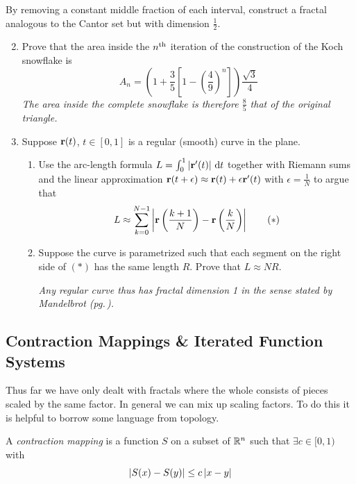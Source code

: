 \begin{exercises}
	\exstart By removing a constant middle fraction of each interval, construct a fractal analogous to the Cantor set but with dimension $\frac 12$.
	
	\begin{enumerate}\setcounter{enumi}{1}\itemsep2pt
		\item Prove that the area inside the $n\textsuperscript{th}$ iteration of the construction of the Koch snowflake is
		\[
			A_n=\left(1+\frac 35\left[1-\left(\frac 49\right)^n\right]\right)\frac{\sqrt 3}{4}
		\]
		\emph{The area inside the complete snowflake is therefore $\frac 85$ that of the original triangle.}
		
		\item Suppose ${\mathbf{r}}(t)$, $t\in [0,1]$ is a regular (smooth) curve in the plane.
		\begin{enumerate}
	  	\item Use the arc-length formula $L=\int_0^1\left| {\mathbf{r}}'(t)\right|\,{\mathrm{d} t}$ together with Riemann sums and the linear approximation ${\mathbf{r}}(t+\epsilon)\approx{\mathbf{r}}(t)+\epsilon{\mathbf{r}}'(t)$ with $\epsilon=\frac 1N$ to argue that
	  	\[
	  		L\approx\sum_{k=0}^{N-1}\left| {\mathbf{r}}\left(\frac{k+1}N\right)-{\mathbf{r}}\left(\frac{k}N\right)\right| \tag{$\ast$}
	  	\]
	
	  	\item Suppose the curve is parametrized such that each segment on the right side of $(\ast)$ has the same length $R$. Prove that $L\approx NR$.\par
	  	\emph{Any regular curve thus has fractal dimension 1 in the sense stated by Mandelbrot (pg.\,\pageref{sec:fracdefn}).}  
		\end{enumerate}
		
	\end{enumerate}
\end{exercises}


\clearpage




\subsection{Contraction Mappings \& Iterated Function Systems}

Thus far we have only dealt with fractals where the whole consists of pieces scaled by the same factor. In general we can mix up scaling factors. To do this it is helpful to borrow some language from topology.

\begin{defn}{}{}
	A \emph{contraction mapping} is a function $S$ on a subset of $\mathbb{R}^n$ such that $\exists c\in[0,1)$ with
	\[
		\left| S(x)-S(y)\right|\le c\left| x-y\right|
	\]
\end{defn}

